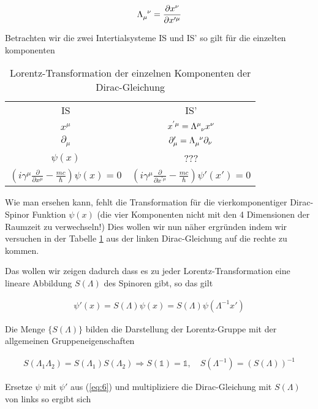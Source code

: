 \begin{align}
  \label{eq:5}
  \Lambda_{\mu}^{\hphantom\mu \nu} = \frac{\partial x^\nu}{\partial x'^\mu }
\end{align}


Betrachten wir die zwei Intertialsysteme IS und IS' so gilt für die einzelten komponenten

\begin{table}[h]
  \centering

\begin{tabular}{c|c}
  IS&IS'\\
\(x^\mu\)& \(x^{'\mu}=\Lambda^\mu_{\hphantom\mu \nu} x^\nu\)\\
\(\partial_\mu \)&\(\partial'_\mu = \Lambda_{\mu}^{\hphantom\mu\nu}\partial_\nu \)\\
\(\psi(x)\)& ???\\
\((i\gamma^\mu\frac{\partial}{\partial x^\mu}-\frac{mc}{\hbar})\psi(x) = 0\)&\((i\gamma^\mu\frac{\partial}{\partial x^{'\mu}}-\frac{mc}{\hbar})\psi'(x') = 0\)
\end{tabular}

  \caption{Lorentz-Transformation der einzelnen Komponenten der Dirac-Gleichung}
  \label{tab:1}
\end{table}

Wie man ersehen kann, fehlt die Transformation für die vierkomponentiger Dirac-Spinor Funktion \(\psi(x)\) (die vier Komponenten nicht mit den 4 Dimensionen der Raumzeit zu verwechseln!)  Dies wollen wir nun näher ergründen indem wir versuchen in der Tabelle \ref{tab:1} aus der linken Dirac-Gleichung auf die rechte zu kommen.

Das wollen wir zeigen dadurch dass es zu jeder Lorentz-Transformation eine lineare Abbildung \(S(\Lambda)\) des Spinoren gibt, so das gilt

\begin{align}
  \label{eq:6}
  \psi'(x) = S(\Lambda)\psi(x) = S(\Lambda)\psi(\Lambda^{-1} x')
\end{align}

Die Menge \(\{S(\Lambda)\}\) bilden die Darstellung der Lorentz-Gruppe mit der allgemeinen Gruppeneigenschaften

\begin{align}
  \label{eq:7}
  \boxed{S(\Lambda_1\Lambda_2) = S(\Lambda_1)S(\Lambda_2) \Rightarrow S(\mathbb 1) = \mathbb 1, \quad S(\Lambda^{-1})=(S(\Lambda))^{-1}}
\end{align}

Ersetze \(\psi\) mit \(\psi'\) aus (\ref{eq:6}) und multipliziere die Dirac-Gleichung mit \(S(\Lambda)\) von links so ergibt sich

